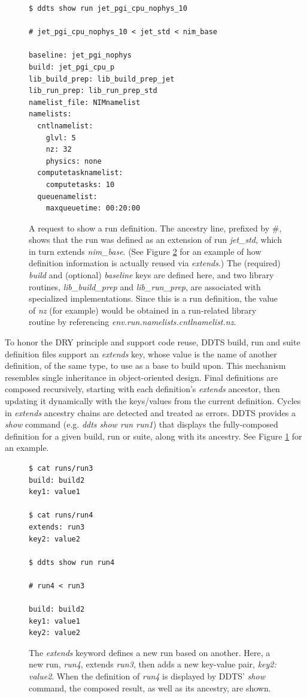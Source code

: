 \documentclass[conference]{IEEEtran}
\begin{document}
\begin{figure}[!t]
{\small \begin{verbatim}
$ ddts show run jet_pgi_cpu_nophys_10

# jet_pgi_cpu_nophys_10 < jet_std < nim_base

baseline: jet_pgi_nophys
build: jet_pgi_cpu_p
lib_build_prep: lib_build_prep_jet
lib_run_prep: lib_run_prep_std
namelist_file: NIMnamelist
namelists:
  cntlnamelist:
    glvl: 5
    nz: 32
    physics: none
  computetasknamelist:
    computetasks: 10
  queuenamelist:
    maxqueuetime: 00:20:00
\end{verbatim} }
\caption{A request to show a run definition. The ancestry line, prefixed by \#, shows that the run was defined as an extension of run \emph{jet\_std}, which in turn extends \emph{nim\_base}. (See Figure \ref{figure:4} for an example of how definition information is actually reused via \emph{extends}.) The (required) \emph{build} and (optional) \emph{baseline} keys are defined here, and two library routines, \emph{lib\_build\_prep} and \emph{lib\_run\_prep}, are associated with specialized implementations. Since this is a run definition, the value of \emph{nz} (for example) would be obtained in a run-related library routine by referencing \emph{env.run.namelists.cntlnamelist.nz}.}
\label{figure:3}
\end{figure}

To honor the DRY principle and support code reuse, DDTS build, run and suite definition files support an \emph{extends} key, whose value is the name of another definition, of the same type, to use as a base to build upon. This mechanism resembles single inheritance in object-oriented design. Final definitions are composed recursively, starting with each definition's \emph{extends} ancestor, then updating it dynamically with the keys/values from the current definition. Cycles in \emph{extends} ancestry chains are detected and treated as errors. DDTS provides a \emph{show} command (e.g. \emph{ddts show run run1}) that displays the fully-composed definition for a given build, run or suite, along with its ancestry. See Figure \ref{figure:3} for an example.

\begin{figure}[!t]
{\small \begin{verbatim}
$ cat runs/run3
build: build2
key1: value1

$ cat runs/run4
extends: run3
key2: value2

$ ddts show run run4

# run4 < run3

build: build2
key1: value1
key2: value2
\end{verbatim} }
\caption{The \emph{extends} keyword defines a new run based on another. Here, a new run, \emph{run4}, extends \emph{run3}, then adds a new key-value pair, \emph{key2: value2}. When the definition of \emph{run4} is displayed by DDTS' \emph{show} command, the composed result, as well as its ancestry, are shown.}
\label{figure:4}
\end{figure}
\end{document}
